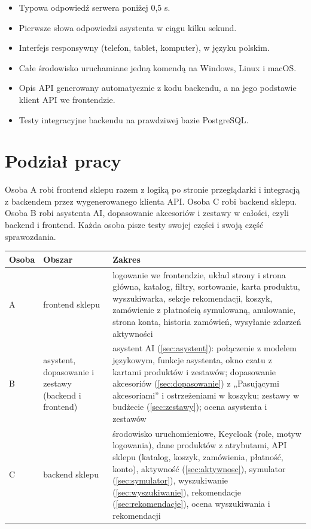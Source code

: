 \documentclass[11pt,a4paper]{article}
\begin{document}
\begin{itemize}
  \item Typowa odpowiedź serwera poniżej 0,5 s.
  \item Pierwsze słowa odpowiedzi asystenta w ciągu kilku sekund.
  \item Interfejs responsywny (telefon, tablet, komputer), w języku polskim.
  \item Całe środowisko uruchamiane jedną komendą na Windows, Linux i macOS.
  \item Opis API generowany automatycznie z kodu backendu, a na jego podstawie klient API we frontendzie.
  \item Testy integracyjne backendu na prawdziwej bazie PostgreSQL.
\end{itemize}

\section{Podział pracy}

Osoba A robi frontend sklepu razem z logiką po stronie przeglądarki i integracją z backendem przez
wygenerowanego klienta API. Osoba C robi backend sklepu. Osoba B robi asystenta AI, dopasowanie akcesoriów
i zestawy w całości, czyli backend i frontend. Każda osoba pisze testy swojej części i swoją część
sprawozdania.

{\footnotesize
\begin{tabularx}{\textwidth}{P{1cm}P{3.4cm}L}
\toprule
\textbf{Osoba} & \textbf{Obszar} & \textbf{Zakres} \\
\midrule
A & frontend sklepu & logowanie we frontendzie, układ strony i strona główna, katalog, filtry, sortowanie,
karta produktu, wyszukiwarka, sekcje rekomendacji, koszyk, zamówienie z płatnością symulowaną, anulowanie,
strona konta, historia zamówień, wysyłanie zdarzeń aktywności \\
B & asystent, dopasowanie i zestawy (backend i frontend) & asystent AI (\ref{sec:asystent}): połączenie
z modelem językowym, funkcje asystenta, okno czatu z kartami produktów i zestawów; dopasowanie akcesoriów
(\ref{sec:dopasowanie}) z „Pasującymi akcesoriami” i ostrzeżeniami w koszyku; zestawy w budżecie
(\ref{sec:zestawy}); ocena asystenta i zestawów \\
C & backend sklepu & środowisko uruchomieniowe, Keycloak (role, motyw logowania), dane produktów
z atrybutami, API sklepu (katalog, koszyk, zamówienia, płatność, konto), aktywność (\ref{sec:aktywnosc}),
symulator (\ref{sec:symulator}), wyszukiwanie (\ref{sec:wyszukiwanie}), rekomendacje
(\ref{sec:rekomendacje}), ocena wyszukiwania i rekomendacji \\
\bottomrule
\end{tabularx}\par\medskip
}
\end{document}
